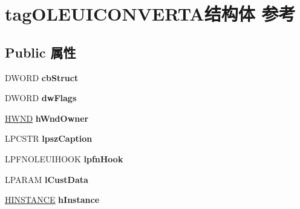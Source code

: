 \hypertarget{structtag_o_l_e_u_i_c_o_n_v_e_r_t_a}{}\section{tag\+O\+L\+E\+U\+I\+C\+O\+N\+V\+E\+R\+T\+A结构体 参考}
\label{structtag_o_l_e_u_i_c_o_n_v_e_r_t_a}
\subsection*{Public 属性}
\begin{DoxyCompactItemize}
\item 
\mbox{\label{structtag_o_l_e_u_i_c_o_n_v_e_r_t_a_a32fba40ac059871ba4bcc800b1947dd5}} 
D\+W\+O\+RD {\bfseries cb\+Struct}
\item 
\mbox{\label{structtag_o_l_e_u_i_c_o_n_v_e_r_t_a_a6238f5d8a259994aa391f862236a85ef}} 
D\+W\+O\+RD {\bfseries dw\+Flags}
\item 
\mbox{\label{structtag_o_l_e_u_i_c_o_n_v_e_r_t_a_ae09356714832966daa1e5d3c42f54c95}} 
\hyperlink{interfacevoid}{H\+W\+ND} {\bfseries h\+Wnd\+Owner}
\item 
\mbox{\label{structtag_o_l_e_u_i_c_o_n_v_e_r_t_a_a8b6b8d7e46ac9623a7854c89fa72e870}} 
L\+P\+C\+S\+TR {\bfseries lpsz\+Caption}
\item 
\mbox{\label{structtag_o_l_e_u_i_c_o_n_v_e_r_t_a_aa6dafe527a74a6b303f94fbcba1c6d56}} 
L\+P\+F\+N\+O\+L\+E\+U\+I\+H\+O\+OK {\bfseries lpfn\+Hook}
\item 
\mbox{\label{structtag_o_l_e_u_i_c_o_n_v_e_r_t_a_a058155956a8501bcbb9e3d9ea33f09a3}} 
L\+P\+A\+R\+AM {\bfseries l\+Cust\+Data}
\item 
\mbox{\label{structtag_o_l_e_u_i_c_o_n_v_e_r_t_a_afe437dbcd382ef1f4ab3d46c66f23ef0}} 
\hyperlink{interfacevoid}{H\+I\+N\+S\+T\+A\+N\+CE} {\bfseries h\+Instance}
\item 
\mbox{\label{structtag_o_l_e_u_i_c_o_n_v_e_r_t_a_a1a8ec7d79f072e8616d269afdfeff83f}} 

\end{DoxyCompactItemize}
